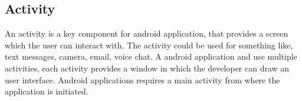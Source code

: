 \subsection{Activity}
An activity is a key component for android application, that provides a screen which the user can interact with. The activity could be used for something like, text messages, camera, email, voice chat. A android application and use multiple activities, each activity provides a window in which the developer can draw an user interface. Android applications requires a main activity from where the application is initiated.